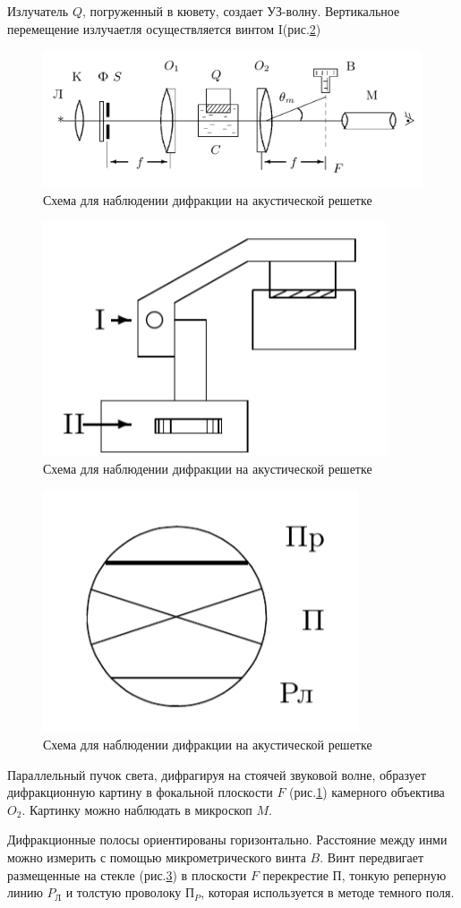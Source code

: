 \documentclass[a4paper,12pt]{article}
\begin{document}
Излучатель $Q$, погруженный в кювету, создает УЗ-волну. Вертикальное перемещение излучаетля осуществляется винтом I(рис.\ref{img5})

\begin{figure}[h]
\centering
\includegraphics[width=0.8\linewidth]{img4.png}
\caption{Схема для наблюдении дифракции на акустической решетке}
\label{img4}
\end{figure}

\begin{figure}[h]
\centering
\includegraphics[width=0.3\linewidth]{img5.png}
\caption{Схема для наблюдении дифракции на акустической решетке}
\label{img5}
\end{figure}

\begin{figure}[h]
\centering
\includegraphics[width=0.3\linewidth]{img6.png}
\caption{Схема для наблюдении дифракции на акустической решетке}
\label{img6}
\end{figure}

Параллельный пучок света, дифрагируя на стоячей звуковой волне, образует дифракционную картину в фокальной плоскости $F$ (рис.\ref{img4}) камерного объектива $O_2$. Картинку можно наблюдать в микроскоп $M$.

Дифракционные полосы ориентированы горизонтально. Расстояние между инми можно измерить с помощью микрометрического винта $B$. Винт передвигает размещенные на стекле (рис.\ref{img6}) в плоскости $F$ перекрестие $\text{П}$, тонкую реперную линию $P_\text{Л}$ и толстую проволоку $\text{П}_P$, которая используется в методе темного поля.
\end{document}
